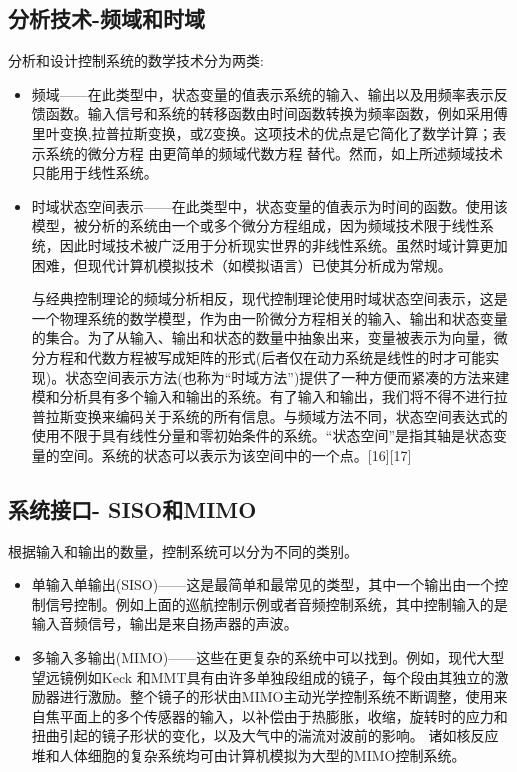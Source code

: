 \subsection{分析技术-频域和时域}

分析和设计控制系统的数学技术分为两类:

\begin{itemize}
\item 频域——在此类型中，状态变量的值表示系统的输入、输出以及用频率表示反馈函数。输入信号和系统的转移函数由时间函数转换为频率函数，例如采用傅里叶变换,拉普拉斯变换，或Z变换。这项技术的优点是它简化了数学计算；表示系统的微分方程 由更简单的频域代数方程 替代。然而，如上所述频域技术只能用于线性系统。
\item 时域状态空间表示——在此类型中，状态变量的值表示为时间的函数。使用该模型，被分析的系统由一个或多个微分方程组成，因为频域技术限于线性系统，因此时域技术被广泛用于分析现实世界的非线性系统。虽然时域计算更加困难，但现代计算机模拟技术（如模拟语言）已使其分析成为常规。

与经典控制理论的频域分析相反，现代控制理论使用时域状态空间表示，这是一个物理系统的数学模型，作为由一阶微分方程相关的输入、输出和状态变量的集合。为了从输入、输出和状态的数量中抽象出来，变量被表示为向量，微分方程和代数方程被写成矩阵的形式(后者仅在动力系统是线性的时才可能实现)。状态空间表示方法(也称为“时域方法”)提供了一种方便而紧凑的方法来建模和分析具有多个输入和输出的系统。有了输入和输出，我们将不得不进行拉普拉斯变换来编码关于系统的所有信息。与频域方法不同，状态空间表达式的使用不限于具有线性分量和零初始条件的系统。“状态空间”是指其轴是状态变量的空间。系统的状态可以表示为该空间中的一个点。[16][17]

\end{itemize}


\subsection{系统接口- SISO和MIMO}

根据输入和输出的数量，控制系统可以分为不同的类别。

\begin{itemize}
\item 单输入单输出(SISO)——这是最简单和最常见的类型，其中一个输出由一个控制信号控制。例如上面的巡航控制示例或者音频控制系统，其中控制输入的是输入音频信号，输出是来自扬声器的声波。
\item 多输入多输出(MIMO)——这些在更复杂的系统中可以找到。例如，现代大型望远镜例如Keck 和MMT具有由许多单独段组成的镜子，每个段由其独立的激励器进行激励。整个镜子的形状由MIMO主动光学控制系统不断调整，使用来自焦平面上的多个传感器的输入，以补偿由于热膨胀，收缩，旋转时的应力和扭曲引起的镜子形状的变化，以及大气中的湍流对波前的影响。 诸如核反应堆和人体细胞的复杂系统均可由计算机模拟为大型的MIMO控制系统。
\end{itemize}

